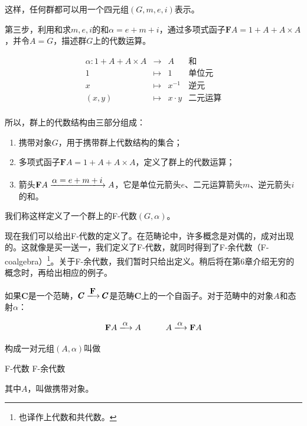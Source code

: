 \documentclass[b5paper]{ctexart}
\begin{document}
\begin{example}
这样，任何群都可以用一个四元组$(G, m, e, i)$表示。

第三步，利用和求$m, e, i$的和$\alpha = e + m + i$，通过多项式函子$\mathbf{F} A = 1 + A + A \times A$，并令$A = G$，描述群$G$上的代数运算。

\[
\begin{array}{rcll}
\alpha : 1 + A + A \times A & \longrightarrow & A & \text{和}\\
1 & \longmapsto & 1 & \text{单位元}  \\
x & \longmapsto & x^{-1} & \text{逆元} \\
(x, y) & \longmapsto & x \cdot y & \text{二元运算} \\
\end{array}
\]

所以，群上的代数结构由三部分组成：

\begin{enumerate}
  \item 携带对象$G$，用于携带群上代数结构的集合；
  \item 多项式函子$\mathbf{F} A = 1 + A + A \times A$，定义了群上的代数运算；
  \item 箭头$\mathbf{F} A \arrowto{\alpha = e + m + i} A$，它是单位元箭头$e$、二元运算箭头$m$、逆元箭头$i$的和。
\end{enumerate}

我们称这样定义了一个群上的F-代数$(G, \alpha)$。
\end{example}

 
现在我们可以给出F-代数的定义了。在范畴论中，许多概念是对偶的，成对出现的。这就像是买一送一，我们定义了F-代数，就同时得到了F-余代数（F-coalgebra）\footnote{也译作上代数和共代数。}。关于F-余代数，我们暂时只给出定义。稍后将在第6章介绍无穷的概念时，再给出相应的例子。

\begin{definition}
如果$\pmb{C}$是一个范畴，$\pmb{C} \arrowto{\mathbf{F}} \pmb{C}$是范畴$\pmb{C}$上的一个自函子。对于范畴中的对象$A$和态射$\alpha$：

\[
  \mathbf{F} A \arrowto{\alpha} A
  \quad \quad \quad
  A \arrowto{\alpha} \mathbf{F} A
\]

构成一对元组$(A, \alpha)$叫做

\begin{center}
  F-代数 \quad \quad \quad F-余代数
\end{center}

其中$A$，叫做携带对象。

\end{definition}
\end{document}
